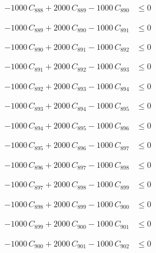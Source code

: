 \documentclass[a4paper,11pt]{article}
\begin{document}
\begin{align}
-1000\,C_{888} + 2000\,C_{889} - 1000\,C_{890} &\leq 0 \nonumber
\end{align}

\begin{align}
-1000\,C_{889} + 2000\,C_{890} - 1000\,C_{891} &\leq 0 \nonumber
\end{align}

\begin{align}
-1000\,C_{890} + 2000\,C_{891} - 1000\,C_{892} &\leq 0 \nonumber
\end{align}

\begin{align}
-1000\,C_{891} + 2000\,C_{892} - 1000\,C_{893} &\leq 0 \nonumber
\end{align}

\begin{align}
-1000\,C_{892} + 2000\,C_{893} - 1000\,C_{894} &\leq 0 \nonumber
\end{align}

\begin{align}
-1000\,C_{893} + 2000\,C_{894} - 1000\,C_{895} &\leq 0 \nonumber
\end{align}

\begin{align}
-1000\,C_{894} + 2000\,C_{895} - 1000\,C_{896} &\leq 0 \nonumber
\end{align}

\begin{align}
-1000\,C_{895} + 2000\,C_{896} - 1000\,C_{897} &\leq 0 \nonumber
\end{align}

\begin{align}
-1000\,C_{896} + 2000\,C_{897} - 1000\,C_{898} &\leq 0 \nonumber
\end{align}

\begin{align}
-1000\,C_{897} + 2000\,C_{898} - 1000\,C_{899} &\leq 0 \nonumber
\end{align}

\begin{align}
-1000\,C_{898} + 2000\,C_{899} - 1000\,C_{900} &\leq 0 \nonumber
\end{align}

\begin{align}
-1000\,C_{899} + 2000\,C_{900} - 1000\,C_{901} &\leq 0 \nonumber
\end{align}

\begin{align}
-1000\,C_{900} + 2000\,C_{901} - 1000\,C_{902} &\leq 0 \nonumber
\end{align}
\end{document}

